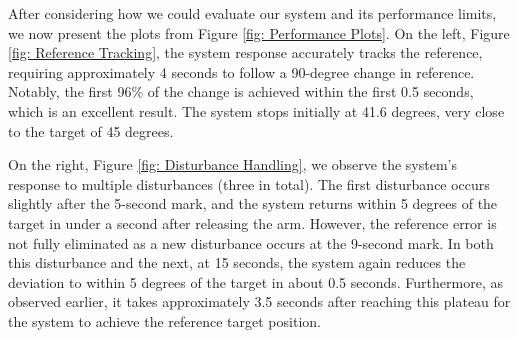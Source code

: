 After considering how we could evaluate our system and its performance limits, we now present the plots from Figure \ref{fig: Performance Plots}. 
On the left, Figure \ref{fig: Reference Tracking}, the system response accurately tracks the reference, requiring approximately 4 seconds to follow a 90-degree change in reference. 
Notably, the first 96\% of the change is achieved within the first 0.5 seconds, which is an excellent result. The system stops initially at 41.6 degrees, very close to the target of 45 degrees.

On the right, Figure \ref{fig: Disturbance Handling}, we observe the system's response to multiple disturbances (three in total). The first disturbance occurs slightly after the 5-second mark, and the system returns within 5 degrees of the target in under a second after releasing the arm. 
However, the reference error is not fully eliminated as a new disturbance occurs at the 9-second mark. In both this disturbance and the next, at 15 seconds, the system again reduces the deviation to within 5 degrees of the target in about 0.5 seconds. 
Furthermore, as observed earlier, it takes approximately 3.5 seconds after reaching this plateau for the system to achieve the reference target position.


